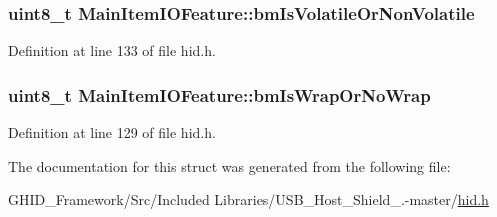 \hypertarget{struct_main_item_i_o_feature_aaa20e71b24fe2de818a85b0cbdcba33e}{
\subsubsection[{bm\-Is\-Volatile\-Or\-Non\-Volatile}]{\setlength{\rightskip}{0pt plus 5cm}uint8\-\_\-t {\bf \-Main\-Item\-I\-O\-Feature\-::bm\-Is\-Volatile\-Or\-Non\-Volatile}}}\label{struct_main_item_i_o_feature_aaa20e71b24fe2de818a85b0cbdcba33e}


\-Definition at line 133 of file hid.\-h.

\hypertarget{struct_main_item_i_o_feature_a7acdfbb4a6b53046205cccae67fa26d4}{
\subsubsection[{bm\-Is\-Wrap\-Or\-No\-Wrap}]{\setlength{\rightskip}{0pt plus 5cm}uint8\-\_\-t {\bf \-Main\-Item\-I\-O\-Feature\-::bm\-Is\-Wrap\-Or\-No\-Wrap}}}\label{struct_main_item_i_o_feature_a7acdfbb4a6b53046205cccae67fa26d4}


\-Definition at line 129 of file hid.\-h.



\-The documentation for this struct was generated from the following file\-:\begin{DoxyCompactItemize}
\item 
\-G\-H\-I\-D\-\_\-\-Framework/\-Src/\-Included Libraries/\-U\-S\-B\-\_\-\-Host\-\_\-\-Shield\-\_.-\/master/\hyperlink{hid_8h}{hid.\-h}\end{DoxyCompactItemize}
